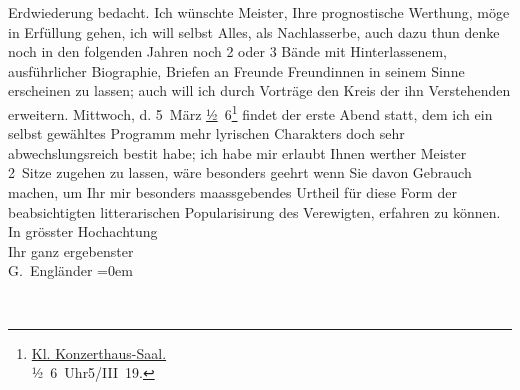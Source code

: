 \begin{ledgroupsized}[t]{13cm}
                    Erdwiederung bedacht.\pend
           \pstart
           Ich wünschte Meister, Ihre prognostische Werthung, möge in Erfüllung gehen, ich
                    will selbst Alles, als Nachlasserbe, auch dazu thun {\kaufmannsund} denke noch in den folgenden Jahren noch 2 oder 3 {\pb}Bände mit Hinterlassenem, ausführlicher
                    Biographie, Briefen an Freunde {\kaufmannsund} Freundinnen in
                    seinem Sinne erscheinen zu lassen; auch will ich durch Vorträge den Kreis der
                    ihn Verstehenden erweitern.\pend
           \pstart
           Mittwoch, d. 5 März{ }\uline{½} 6\footnote{\noindent{}\uline{Kl.
                                Konzerthaus-Saal.}{\\}½ 6 Uhr\hspace*{1em}5/III 19.} findet der erste Abend statt, dem ich ein selbst gewähltes Programm
                    mehr lyrischen Charakters {\kaufmannsund} doch sehr
                    abwechslungsreich besti{\geminationm}t habe; ich habe mir
                    erlaubt Ihnen werther Meister 2 Sitze zugehen zu lassen, wäre besonders
                    geehrt wenn Sie davon Gebrauch machen, um Ihr mir besonders maassgebendes
                    Urtheil für diese Form der beabsichtigten litterarischen Popularisirung des Verewigten, erfahren zu
                    können.\pend
           \pstart
           In grösster Hochachtung{\\[\baselineskip]}Ihr ganz ergebenster{\\[\baselineskip]}\spacefill\mbox{G.
                        Engländer}\pend
           \leftskip=0em{}\endnumbering{}\end{ledgroupsized}  \newcommand{\dateiname}{L02321}\newcommand{\titel}{Georg Engländer an Arthur Schnitzler, 27. 2. 1919}\newcommand{\editorInnen}{Martin Anton Müller und Gerd-Hermann Susen}
      
